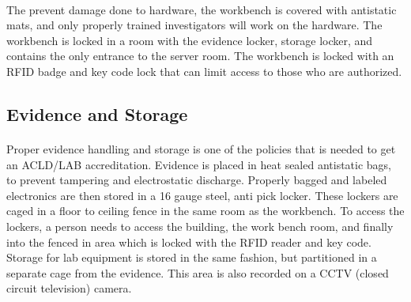 \documentclass[12pt]{article}
\begin{document}
\paragraph{}
The prevent damage done to hardware, the workbench is covered with antistatic mats, and only properly trained investigators will work on the hardware.
The workbench is locked in a room with the evidence locker, storage locker, and contains the only entrance to the server room.
The workbench is locked with an RFID badge and key code lock that can limit access to those who are authorized.

\subsection{Evidence and Storage}
\paragraph{}
Proper evidence handling and storage is one of the policies that is needed to get an ACLD/LAB accreditation.
Evidence is placed in heat sealed antistatic bags, to prevent tampering and electrostatic discharge.
Properly bagged and labeled electronics are then stored in a 16 gauge steel, anti pick locker.
These lockers are caged in a floor to ceiling fence in the same room as the workbench.  
To access the lockers, a person needs to access the building, the work bench room, and finally into the fenced in area which is locked with the RFID reader and key code.
Storage for lab equipment is stored in the same fashion, but partitioned in a separate cage from the evidence.
This area is also recorded on a CCTV (closed circuit television) camera. 
\end{document}
